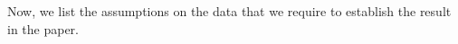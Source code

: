 \documentclass[11pt]{article}
\def\es{\varepsilon}
\def\T{\mathcal{T}}
\newcommand{\di}[1]{\,\mathrm{d}#1}
\begin{document}
\begin{itemize}


\end{itemize}
Now, we list the assumptions on the data that we require to establish the result in the paper.
\end{document}
